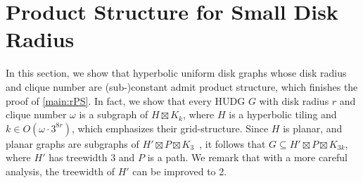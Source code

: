 \documentclass[11pt]{article}
\providecommand{\todo}[2][]{}
\newcommand{\thomas}[1]{}
\DeclareMathOperator{\tw}{tw}
\begin{document}
\section{Product Structure for Small Disk Radius}
\label{sec:upper_bound}
%
\newcommand{\upperBound}{3^{8r}}
%
%
%
In this section, we show that hyperbolic uniform disk graphs whose disk radius and clique number are (sub-)constant admit product structure, which finishes the proof of \cref{main:rPS}.
In fact, we show that every HUDG $ G $ with disk radius $ r $ and clique number $ \omega $ is a subgraph of $ H \boxtimes K_k $, where $ H $ is a hyperbolic tiling and $ k \in O(\omega \cdot \upperBound) $, which emphasizes their grid-structure.
Since $ H $ is planar, and planar graphs are subgraphs of $ H' \boxtimes P \boxtimes K_3 $~\cite{dujmovic_planar_2019}, it follows that $ G \subseteq H' \boxtimes P \boxtimes K_{3k} $, where $ H' $ has treewidth $ 3 $ and $ P $ is a path.
We remark that with a more careful analysis, the treewidth of $ H' $ can be improved to 2.
\todo{maybe do this}%
\end{document}
